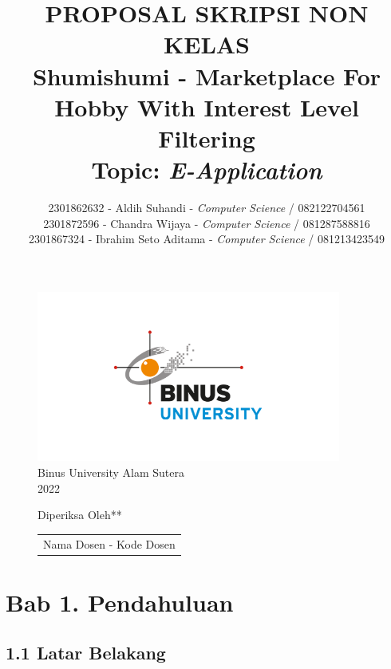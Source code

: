 \documentclass[a4paper]{article}
\begin{document}

\title{PROPOSAL SKRIPSI NON KELAS\\Shumishumi - Marketplace For Hobby With Interest Level Filtering\large\\\textbf{Topic: }\textit{E-Application}}
\author{2301862632 - Aldih Suhandi - \textit{Computer Science} / 082122704561\\2301872596 - Chandra Wijaya - \textit{Computer Science} / 081287588816\\2301867324 - Ibrahim Seto Aditama - \textit{Computer Science} / 081213423549}


\maketitle
\begin{figure}[h]
    \centering
    \includegraphics[width=10cm]{logo_binus.png}\\
    Binus University Alam Sutera\\
    2022
\end{figure}
\begin{figure}[h]
    \centering
    Diperiksa Oleh**\\
    \vspace{15mm}
    \begin{tabular}{@{}p{2.5in}@{}}
        \centering
        Nama Dosen - Kode Dosen
    \end{tabular}
\end{figure}

\newpage
{}
\tableofcontents

\newpage
\section*{Bab 1. Pendahuluan}

\subsection*{1.1 Latar Belakang}
\end{document}
